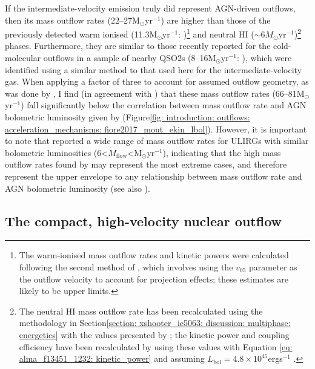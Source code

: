 If the intermediate-velocity emission truly did represent AGN-driven outflows, then its mass outflow rates (22--27\;M$_\odot$\;yr$^{-1}$) are higher than those of the previously detected warm ionised (11.3\;M$_\odot$\;yr$^{-1}$: \citealt{Rose2018})\footnote{The warm-ionised mass outflow rates and kinetic powers were calculated following the second method of \citet{Rose2018}, which involves using the $v_\mathrm{05}$ parameter as the outflow velocity to account for projection effects; these estimates are likely to be upper limits.} and neutral HI ($\sim$6\;$M_\odot$\;yr$^{-1}$)\footnote{The neutral HI mass outflow rate has been recalculated using the methodology in Section\;\ref{section: xshooter_ic5063: discussion: multiphase: energetics} with the values presented by \citet{Morganti2013_4c1250}; the kinetic power and coupling efficiency have been recalculated by using these values with Equation \ref{eq: alma_f13451_1232: kinetic_power} and assuming $L_\mathrm{bol}=4.8\times10^{45}$\;erg\;s$^{-1}$ \citep{Rose2018}.} phases. Furthermore, they are similar to those recently reported for the cold-molecular outflows in a sample of nearby QSO2s (8--16\;M$_\odot$\;yr$^{-1}$: \citealt{RamosAlmeida2022}), which were identified using a similar method to that used here for the intermediate-velocity gas. When applying a factor of three to account for assumed outflow geometry, as was done by \citet{Fiore2017}, I find (in agreement with \citealt{RamosAlmeida2022}) that these mass outflow rates (66--81\;M$_\odot$\;yr$^{-1}$) fall significantly below the correlation between mass outflow rate and AGN bolometric luminosity given by \citet{Fiore2017} (Figure\;\ref{fig: introduction: outflows: acceleration_mechanisms: fiore2017_mout_ekin_lbol}). However, it is important to note that \citet{Lamperti2022} reported a wide range of mass outflow rates for ULIRGs with similar bolometric luminosities (6\;\textless\;$\dot{M}_\mathrm{flow}$\;\textless{}\;M$_\odot$\;yr$^{-1}$), indicating that the high mass outflow rates found by \citet{Fiore2017} may represent the most extreme cases, and therefore represent the upper envelope to any relationship between mass outflow rate and AGN bolometric luminosity (see also \citealt{Speranza2024}).

\subsection{The compact, high-velocity nuclear outflow}
\label{section: alma_f13451_1232: discussion: nuclear_outflow}


